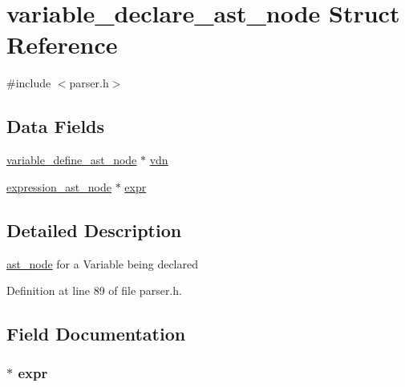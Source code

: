\hypertarget{structvariable__declare__ast__node}{\section{variable\+\_\+declare\+\_\+ast\+\_\+node Struct Reference}
\label{structvariable__declare__ast__node}
}


{\ttfamily \#include $<$parser.\+h$>$}

\subsection*{Data Fields}
\begin{DoxyCompactItemize}
\item 
\hyperlink{structvariable__define__ast__node}{variable\+\_\+define\+\_\+ast\+\_\+node} $\ast$ \hyperlink{structvariable__declare__ast__node_ac1fcaa71348864544823e2a73cc23a26}{vdn}
\item 
\hyperlink{parser_8h_a24e739ff40763d29ca9d4dab5b30819f}{expression\+\_\+ast\+\_\+node} $\ast$ \hyperlink{structvariable__declare__ast__node_af0ee16005d665771829bfa0e2ec96040}{expr}
\end{DoxyCompactItemize}


\subsection{Detailed Description}
\hyperlink{structast__node}{ast\+\_\+node} for a Variable being declared 

Definition at line 89 of file parser.\+h.



\subsection{Field Documentation}
\hypertarget{structvariable__declare__ast__node_af0ee16005d665771829bfa0e2ec96040}{
\subsubsection[{expr}]{$\ast$ expr}}\label{structvariable__declare__ast__node_af0ee16005d665771829bfa0e2ec96040}


